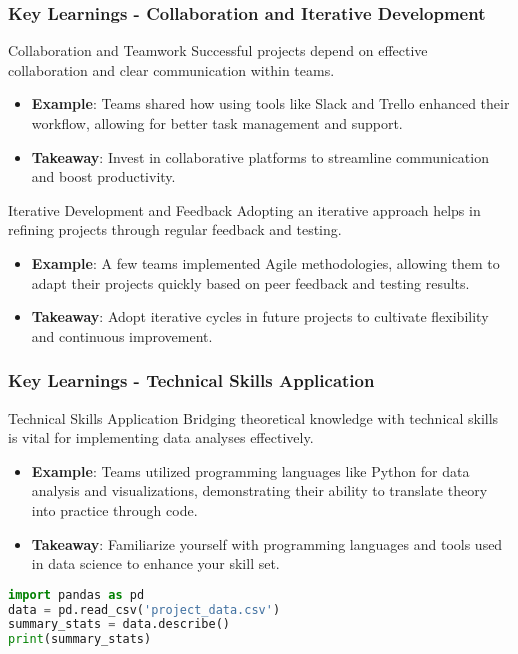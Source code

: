 \documentclass{beamer}
\begin{document}
\begin{frame}
    \frametitle{Key Learnings - Collaboration and Iterative Development}
    \begin{block}{Collaboration and Teamwork}
        Successful projects depend on effective collaboration and clear communication within teams.
    \end{block}
    \begin{itemize}
        \item \textbf{Example}: Teams shared how using tools like Slack and Trello enhanced their workflow, allowing for better task management and support.
        \item \textbf{Takeaway}: Invest in collaborative platforms to streamline communication and boost productivity.
    \end{itemize}

    \begin{block}{Iterative Development and Feedback}
        Adopting an iterative approach helps in refining projects through regular feedback and testing.
    \end{block}
    \begin{itemize}
        \item \textbf{Example}: A few teams implemented Agile methodologies, allowing them to adapt their projects quickly based on peer feedback and testing results.
        \item \textbf{Takeaway}: Adopt iterative cycles in future projects to cultivate flexibility and continuous improvement.
    \end{itemize}
\end{frame}

\begin{frame}[fragile]
    \frametitle{Key Learnings - Technical Skills Application}
    \begin{block}{Technical Skills Application}
        Bridging theoretical knowledge with technical skills is vital for implementing data analyses effectively.
    \end{block}
    \begin{itemize}
        \item \textbf{Example}: Teams utilized programming languages like Python for data analysis and visualizations, demonstrating their ability to translate theory into practice through code.
        \item \textbf{Takeaway}: Familiarize yourself with programming languages and tools used in data science to enhance your skill set.
    \end{itemize}
    \begin{lstlisting}[language=Python]
import pandas as pd
data = pd.read_csv('project_data.csv')
summary_stats = data.describe()
print(summary_stats)
    \end{lstlisting}
\end{frame}
\end{document}
